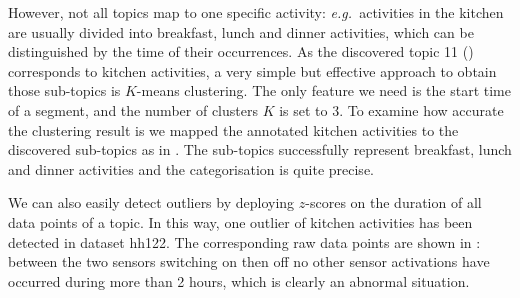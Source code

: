 \documentclass{article}
\newcommand{\eg}{{\em e.g.~\/}}
\begin{document}
However, not all topics map to one specific activity: \eg activities in the kitchen are usually divided into breakfast, lunch and dinner activities, which can be distinguished by the time of their occurrences. As the discovered topic 11 () corresponds to kitchen activities, a very simple but effective approach to obtain those sub-topics is $K$-means clustering. The only feature we need is the start time of a segment, and the number of clusters $K$ is set to 3. To examine how accurate the clustering result is we mapped the annotated kitchen activities to the discovered sub-topics as in . The sub-topics successfully represent breakfast, lunch and dinner activities and the categorisation is quite precise.

We can also easily detect outliers by deploying $z$-scores on the duration of all data points of a topic. In this way, one outlier of kitchen activities has been detected in dataset hh122. The corresponding raw data points are shown in : between the two sensors switching on then off no other sensor activations have occurred during more than 2 hours, which is clearly an abnormal situation.
\end{document}
